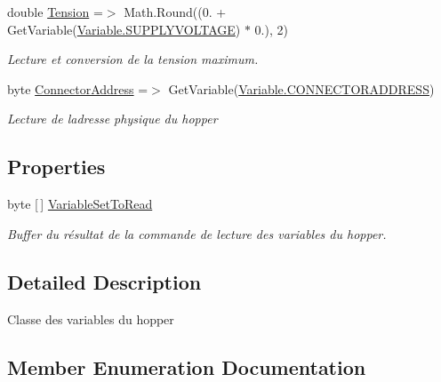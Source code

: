 \begin{DoxyCompactItemize}
double \mbox{\hyperlink{class_device_library_1_1_c_hopper_variable_set_a816c9c3bacbc51aa30ea4eb8ea7ae6bd}{Tension}} =$>$ Math.\+Round((0. + Get\+Variable(\mbox{\hyperlink{class_device_library_1_1_c_hopper_variable_set_a3b79d051f89692abb5d34ae3f4e946bea7040277bb149f1bd783b3f78ad856099}{Variable.\+S\+U\+P\+P\+L\+Y\+V\+O\+L\+T\+A\+GE}}) $\ast$ 0.), 2)
\begin{DoxyCompactList}\small\item\em Lecture et conversion de la tension maximum. \end{DoxyCompactList}\item 
byte \mbox{\hyperlink{class_device_library_1_1_c_hopper_variable_set_ad10cd1f59fe7737b96eadfa251b88df9}{Connector\+Address}} =$>$ Get\+Variable(\mbox{\hyperlink{class_device_library_1_1_c_hopper_variable_set_a3b79d051f89692abb5d34ae3f4e946beaf12ce2bca6832b6bcb08478fb3d50026}{Variable.\+C\+O\+N\+N\+E\+C\+T\+O\+R\+A\+D\+D\+R\+E\+SS}})
\begin{DoxyCompactList}\small\item\em Lecture de l\textquotesingle{}adresse physique du hopper \end{DoxyCompactList}\end{DoxyCompactItemize}
\subsection*{Properties}
\begin{DoxyCompactItemize}
\item 
byte \mbox{[}$\,$\mbox{]} \mbox{\hyperlink{class_device_library_1_1_c_hopper_variable_set_a4ab954fb5d79fdaa7d4cebc7922b3c78}{Variable\+Set\+To\+Read}}
\begin{DoxyCompactList}\small\item\em Buffer du résultat de la commande de lecture des variables du hopper. \end{DoxyCompactList}\end{DoxyCompactItemize}


\subsection{Detailed Description}
Classe des variables du hopper 



\subsection{Member Enumeration Documentation}
\mbox{\label{class_device_library_1_1_c_hopper_variable_set_a6d46e753370657ed1e4f4ab7bea0dacf}} 
